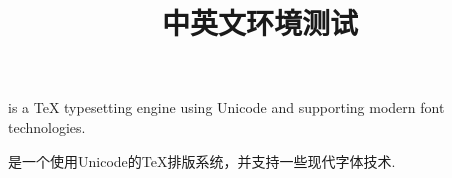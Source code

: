 \documentclass[12pt,a4paper]{article}
\date{} %
\title{\XeTeX{} 中英文环境测试}
\begin{document}
\maketitle

\XeTeX{} is a \TeX{} typesetting engine using Unicode and supporting modern font technologies.

\XeLaTeX{} 是一个使用Unicode的\TeX{}排版系统，并支持一些现代字体技术.
\end{document}
